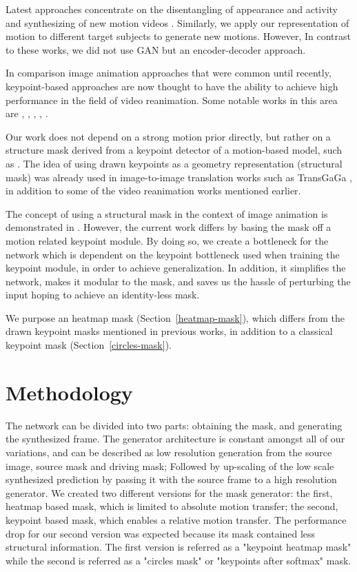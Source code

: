 \documentclass{article}
\begin{document}
Latest approaches concentrate on the disentangling of appearance and
activity and synthesizing of new motion videos \cite{tulyakov2018mocogan}.
Similarly, we apply our representation of motion to different target
subjects to generate new motions. However, In contrast to these works,
we did not use GAN but an encoder-decoder approach.

In comparison image animation approaches that were
common until recently, keypoint-based approaches are now thought to have
the ability to achieve high performance in the field of video reanimation.
Some notable works in
this area are \cite{siarohin2020order},
\cite{siarohin2019animating}, \cite{kim2019unsupervised},
\cite{balakrishnan2018synthesizing}, \cite{ma2017pose}
\cite{chan2019everybody}.

Our work does not depend on a strong
motion prior directly, but rather on a
structure mask derived from a keypoint detector of a motion-based model,
such as \cite{siarohin2020order}. The idea of using drawn keypoints as a
geometry representation (structural mask) was already used in image-to-image
translation works such as TransGaGa \cite{wu2019transgaga}, in addition to
some of the video reanimation works mentioned earlier.


The concept of using a structural mask in the context of image animation is
demonstrated in \cite{shalev2020image}. However, the current work differs
by basing the mask off a motion related keypoint module.
By doing so, we create a bottleneck for the network which is dependent on
the keypoint bottleneck used when training the keypoint module, in order to
achieve generalization. In addition, it simplifies the network, makes it
modular to the mask, and saves us the hassle of perturbing the input
hoping to achieve an identity-less mask.

We purpose an heatmap mask (Section~\ref{heatmap-mask}),
which differs from the drawn keypoint masks mentioned in previous works, in
addition to a classical keypoint mask (Section~\ref{circles-mask}).

\section{Methodology}
The network can be divided into two parts: obtaining the mask, and generating
the synthesized frame. The generator architecture is constant amongst all of
our variations, and can be described as low resolution generation from the
source image, source mask and driving mask; Followed by up-scaling of the
low scale synthesized prediction by passing it with the source frame to a
high resolution generator.
We created two different versions for the mask generator: the first,
heatmap based mask, which is limited to absolute motion transfer;
the second, keypoint based mask, which enables a relative motion transfer.
The performance drop for our second version was expected because
its mask contained less structural information.
The first version is referred as a "keypoint heatmap mask" while the second
is referred as a "circles mask" or "keypoints after softmax" mask.
\end{document}
